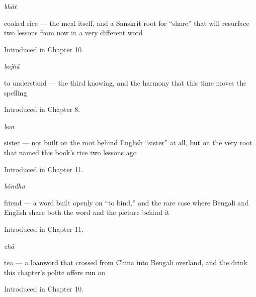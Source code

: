 \noindent\begin{minipage}[t]{\linewidth}
\raggedright
\textbf{}\enspace\emph{bhāt}\par
\small cooked rice — the meal itself, and a Sanskrit root for \textquotedblleft{}share\textquotedblright{} that will resurface two lessons from now in a very different word\par
\footnotesize Introduced in Chapter 10.
\end{minipage}\par\medskip

\noindent\begin{minipage}[t]{\linewidth}
\raggedright
\textbf{}\enspace\emph{bojhā}\par
\small to understand — the third knowing, and the harmony that this time moves the spelling\par
\footnotesize Introduced in Chapter 8.
\end{minipage}\par\medskip

\noindent\begin{minipage}[t]{\linewidth}
\raggedright
\textbf{}\enspace\emph{bon}\par
\small sister — not built on the root behind English \textquotedblleft{}sister\textquotedblright{} at all, but on the very root that named this book's rice two lessons ago\par
\footnotesize Introduced in Chapter 11.
\end{minipage}\par\medskip

\noindent\begin{minipage}[t]{\linewidth}
\raggedright
\textbf{}\enspace\emph{bôndhu}\par
\small friend — a word built openly on \textquotedblleft{}to bind,\textquotedblright{} and the rare case where Bengali and English share both the word and the picture behind it\par
\footnotesize Introduced in Chapter 11.
\end{minipage}\par\medskip

\noindent\begin{minipage}[t]{\linewidth}
\raggedright
\textbf{}\enspace\emph{chā}\par
\small tea — a loanword that crossed from China into Bengali overland, and the drink this chapter's polite offers run on\par
\footnotesize Introduced in Chapter 10.
\end{minipage}\par\medskip

